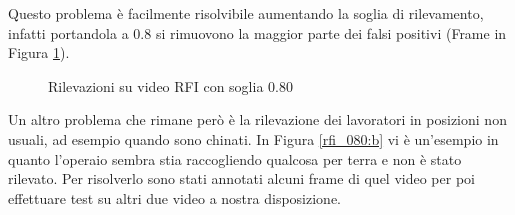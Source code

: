 Questo problema è facilmente risolvibile aumentando la soglia di rilevamento, infatti portandola a $0.8$ si rimuovono la maggior parte dei falsi positivi (Frame in Figura \ref{fig:rfi_080}). 

\begin{figure}[]
    \begin{minipage}{.5\linewidth}
        \centering
    \end{minipage}%
    \begin{minipage}{.5\linewidth}
        \centering
    \end{minipage}
    \centering
    \caption{Rilevazioni su video RFI con soglia 0.80}
    \label{fig:rfi_080}
\end{figure}

Un altro problema che rimane però è la rilevazione dei lavoratori in posizioni non usuali, ad esempio quando sono chinati. In Figura \ref{rfi_080:b} vi è un'esempio in quanto l'operaio sembra stia raccogliendo qualcosa per terra e non è stato rilevato. Per risolverlo sono stati annotati alcuni frame di quel video per poi effettuare test su altri due video a nostra disposizione. 
